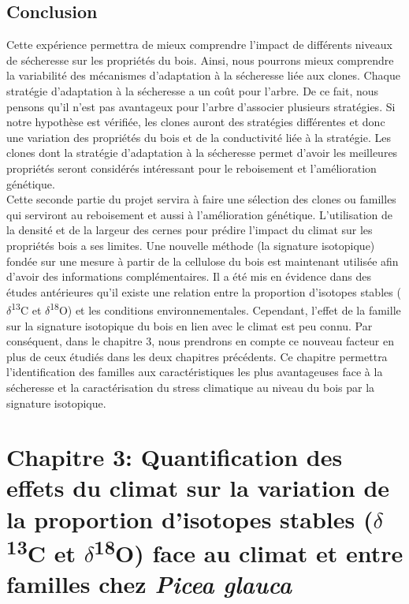 \documentclass[a4paper,12pt]{report}
\newcommand{\Ctreize}{$\delta$\textsuperscript{13}C\xspace}
\newcommand{\Odixhuit}{$\delta$\textsuperscript{18}O\xspace}
\begin{document}
\section{Conclusion}

Cette expérience permettra de mieux comprendre l'impact de différents niveaux de sécheresse sur les propriétés du bois. Ainsi, nous pourrons mieux comprendre la variabilité des mécanismes d'adaptation à la sécheresse liée aux clones. Chaque stratégie d'adaptation à la sécheresse a un coût pour l'arbre. De ce fait, nous pensons qu'il n'est pas avantageux pour l'arbre d'associer plusieurs stratégies. Si notre hypothèse est vérifiée, les clones auront des stratégies différentes et donc une variation des propriétés du bois et de la conductivité liée à la stratégie. Les clones dont la stratégie d'adaptation à la sécheresse permet d'avoir les meilleures propriétés seront considérés intéressant pour le reboisement et l'amélioration génétique.\\

Cette seconde partie du projet servira à faire une sélection des clones ou familles qui serviront au reboisement et aussi à l'amélioration génétique. L'utilisation de la densité et de la largeur des cernes pour prédire l'impact du climat sur les propriétés bois a ses limites. Une nouvelle méthode (la signature isotopique) fondée sur une mesure à partir de la cellulose du bois est maintenant utilisée afin d'avoir des informations complémentaires. Il a été mis en évidence dans des études antérieures qu'il existe une relation entre la proportion d'isotopes stables (\Ctreize et \Odixhuit) et les conditions environnementales. Cependant, l'effet de la famille sur la signature isotopique du bois en lien avec le climat est peu connu.  Par conséquent, dans le chapitre 3, nous prendrons en compte ce nouveau facteur en plus de ceux étudiés dans les deux chapitres précédents. Ce chapitre permettra l'identification des familles aux caractéristiques les plus avantageuses face à la sécheresse et la caractérisation du stress climatique au niveau du bois par la signature isotopique.


\chapter{Chapitre 3: Quantification des effets du climat sur la variation de la proportion d'isotopes stables (\Ctreize et \Odixhuit) face au climat et entre familles chez \textit{Picea glauca}}
\end{document}
